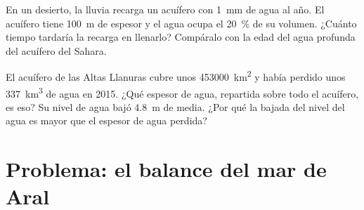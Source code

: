 \begin{exercise}[$\star\star\star$]\label{exo:g10:freshwater-resources:14}
En un desierto, la lluvia recarga un acuífero con \qty{1}{mm} de agua al
año. El acuífero tiene \qty{100}{m} de espesor y el agua ocupa el
\qty{20}{\percent} de su volumen. ¿Cuánto tiempo tardaría la recarga en
llenarlo? Compáralo con la edad del agua profunda del acuífero del Sahara.
\end{exercise}

\begin{exercise}[$\star\star\star$]\label{exo:g10:freshwater-resources:15}
El acuífero de las Altas Llanuras cubre unos \qty{453000}{km^2} y había
perdido unos \qty{337}{km^3} de agua en 2015. ¿Qué espesor de agua,
repartida sobre todo el acuífero, es eso? Su nivel de agua bajó
\qty{4.8}{m} de media. ¿Por qué la bajada del nivel del agua es mayor que el
espesor de agua perdida?
\end{exercise}

\section{Problema: el balance del mar de Aral}

